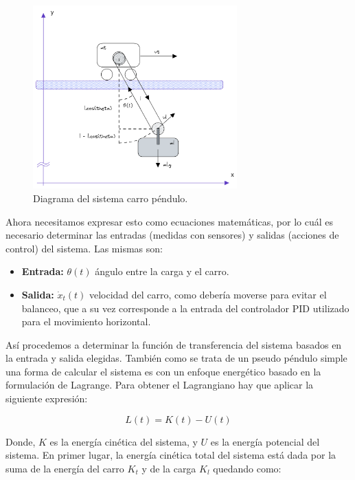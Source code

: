 \documentclass[11pt]{article}
\begin{document}
\begin{figure}[h!]
	\centering
	\includegraphics[width=0.7\textwidth]{images/reemplazo_pendulo.png}
	\caption{Diagrama del sistema carro péndulo.}
	\label{fig:sistema_carro_pendulo}
\end{figure}

Ahora necesitamos expresar esto como ecuaciones matemáticas, por lo cuál es necesario determinar las entradas (medidas con sensores) y salidas (acciones de control) del sistema. Las mismas son:

\begin{itemize}
	\item \textbf{Entrada:} $\theta (t)$ ángulo entre la carga y el carro.
	\item \textbf{Salida:} $\dot{x}_{t}(t)$ velocidad del carro, como debería moverse para evitar el balanceo, que a su vez corresponde a la entrada del controlador PID utilizado para el movimiento horizontal.
\end{itemize}

Así procedemos a determinar la función de transferencia del sistema basados en la entrada y salida elegidas. También como se trata de un pseudo péndulo simple una forma de calcular el sistema es con un enfoque energético basado en la formulación de Lagrange. Para obtener el Lagrangiano hay que aplicar la siguiente expresión:

\begin{equation}
	\label{eq:lagrangiano}
	L(t)=K(t)-U(t)
\end{equation}

Donde, $K$ es la energía cinética del sistema, y $U$ es la energía potencial del sistema. En primer lugar, la energía cinética total del sistema está dada por la suma de la energía del carro $K_{t}$ y de la carga $K_{l}$ quedando como:
\end{document}
